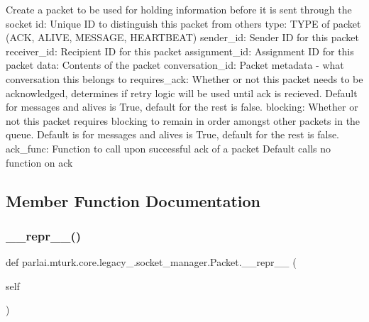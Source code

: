 \begin{DoxyVerb}Create a packet to be used for holding information before it is
sent through the socket
id:               Unique ID to distinguish this packet from others
type:             TYPE of packet (ACK, ALIVE, MESSAGE, HEARTBEAT)
sender_id:        Sender ID for this packet
receiver_id:      Recipient ID for this packet
assignment_id:    Assignment ID for this packet
data:             Contents of the packet
conversation_id:  Packet metadata - what conversation this belongs to
requires_ack:     Whether or not this packet needs to be acknowledged,
           determines if retry logic will be used until ack is
           recieved. Default for messages and alives is True,
           default for the rest is false.
blocking:         Whether or not this packet requires blocking to
           remain in order amongst other packets in the queue.
           Default is for messages and alives is True, default
           for the rest is false.
ack_func:         Function to call upon successful ack of a packet
           Default calls no function on ack
\end{DoxyVerb}
 

\subsection{Member Function Documentation}
\mbox{\label{classparlai_1_1mturk_1_1core_1_1legacy__2018_1_1socket__manager_1_1Packet_ab584329eae3598c36a1ae14a58be7e72}} 
\subsubsection{\texorpdfstring{\+\_\+\+\_\+repr\+\_\+\+\_\+()}{\_\_repr\_\_()}}
{\footnotesize\ttfamily def parlai.\+mturk.\+core.\+legacy\+\_.\+socket\+\_\+manager.\+Packet.\+\_\+\+\_\+repr\+\_\+\+\_\+ (\begin{DoxyParamCaption}\item[{}]{self }\end{DoxyParamCaption})}

